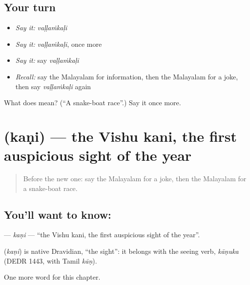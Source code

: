 \subsection*{Your turn}
\begin{itemize}
\raggedright
  \item \emph{Say it:} \emph{vaḷḷaṁkaḷi}
  \item \emph{Say it:} \emph{vaḷḷaṁkaḷi}, once more
  \item \emph{Say it:} say \emph{vaḷḷaṁkaḷi}
  \item \emph{Recall:} say the Malayalam for information, then the Malayalam for a joke, then say \emph{vaḷḷaṁkaḷi} again
\end{itemize}

\begin{tcolorbox}[breakable,colback=teal!4,colframe=teal!35!black,title={Before you move on}]
What does  mean? (\textquotedblleft{}A snake-boat race\textquotedblright{}.) Say it once more.
\end{tcolorbox}
\section[\texorpdfstring{\ml{കണി} (kaṇi)}{കണി (kaṇi)}]{ (kaṇi) — the Vishu kani, the first auspicious sight of the year}

\label{lesson:ML-C252-kani}



\begin{quote}
Before the new one: say the Malayalam for a joke, then the Malayalam for a snake-boat race.
\end{quote}

\subsection*{You'll want to know: }
\textbf{} — \emph{kaṇi} — \textquotedblleft{}the Vishu kani, the first auspicious sight of the year\textquotedblright{}.

\begin{cousinweb}
\textbf{} (\emph{kaṇi}) is native Dravidian, \textquotedblleft{}the sight\textquotedblright{}: it belongs with the seeing verb, \emph{kāṇuka} (DEDR 1443, with Tamil \emph{kāṇ}).
\end{cousinweb}

\begin{grammarlens}[title={What you've built}]
One more word for this chapter.
\end{grammarlens}

